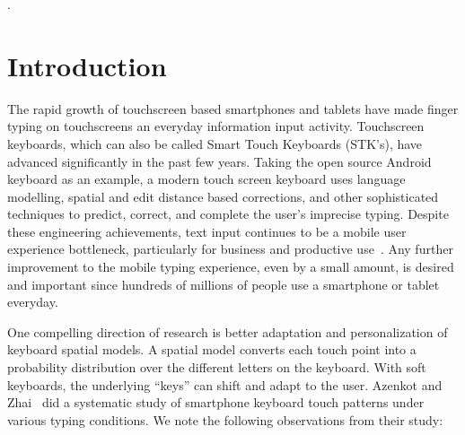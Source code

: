 \documentclass{sigchi}
\begin{document}

.

\section{Introduction}
The rapid growth of touchscreen based smartphones and tablets have made finger typing on touchscreens an everyday information input activity. Touchscreen keyboards, which can also be called Smart Touch Keyboards (STK’s), have advanced significantly in the past few years. Taking the open source Android keyboard as an example, a modern touch screen keyboard uses language modelling, spatial and edit distance based corrections, and other sophisticated techniques to predict, correct, and complete the user’s imprecise typing. Despite these engineering achievements, text input continues to be a mobile user experience bottleneck, particularly for business and productive use~\cite{Bao:2011}. Any further improvement to the mobile typing experience, even by a small amount, is desired and important since hundreds of millions of people use a smartphone or tablet everyday.

One compelling direction of research is better adaptation and personalization of keyboard spatial models. A spatial model converts each touch point into a probability distribution over the different letters on the keyboard. With soft keyboards, the underlying ``keys'' can shift and adapt to the user. Azenkot and Zhai~\cite{Azenkot:2012} did a systematic study of smartphone keyboard touch patterns under various typing conditions. We note the following observations from their study:
\end{document}
